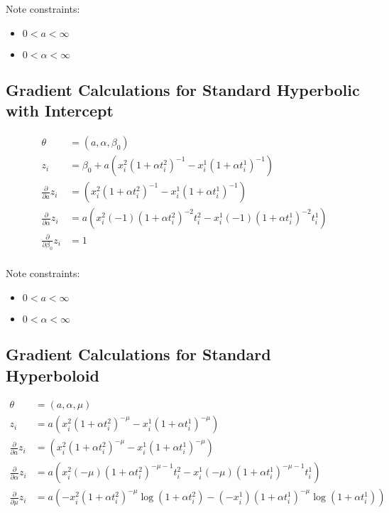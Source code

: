 \documentclass[12pt]{article}
\begin{document}
Note constraints:

\begin{itemize}
    \item{$0 < a < \infty$}
    \item{$0 < \alpha < \infty$}
\end{itemize}

\subsection{Gradient Calculations for Standard Hyperbolic with Intercept}

\begin{align*}
\theta &= (a, \alpha, \beta_0) \\
z_i &= \beta_0 + a (x^2_i (1 + \alpha t^2_i)^{-1} - x^1_i (1 + \alpha t^1_i)^{-1}) \\
\frac{\partial}{\partial a} z_i
  &= (x^2_i (1 + \alpha t^2_i)^{-1} - x^1_i (1 + \alpha t^1_i)^{-1}) \\
\frac{\partial}{\partial \alpha} z_i
  &= a (
    x^2_i (-1) (1 + \alpha t^2_i)^{-2} t^2_i
    - x^1_i (-1) (1 + \alpha t^1_i)^{-2} t^1_i
  ) \\
\frac{\partial}{\partial \beta_0} z_i &= 1 \\
\end{align*}

Note constraints:

\begin{itemize}
    \item{$0 < a < \infty$}
    \item{$0 < \alpha < \infty$}
\end{itemize}

\subsection{Gradient Calculations for Standard Hyperboloid}

\begin{align*}
\theta &= (a, \alpha, \mu) \\
z_i &= a (x^2_i (1 + \alpha t^2_i)^{-\mu} - x^1_i (1 + \alpha t^1_i)^{-\mu}) \\
\frac{\partial}{\partial a} z_i
  &= (x^2_i (1 + \alpha t^2_i)^{-\mu} - x^1_i (1 + \alpha t^1_i)^{-\mu}) \\
\frac{\partial}{\partial \alpha} z_i
  &= a (
    x^2_i (-\mu) (1 + \alpha t^2_i)^{-\mu - 1} t^2_i
    - x^1_i (-\mu) (1 + \alpha t^1_i)^{-\mu - 1} t^1_i
  ) \\
\frac{\partial}{\partial \mu} z_i
  &= a (
    -x^2_i (1 + \alpha t^2_i)^{-\mu} \log(1 + \alpha t^2_i)
    - (-x^1_i) (1 + \alpha t^1_i)^{-\mu} \log(1 + \alpha t^1_i)
  ) \\
\end{align*}
\end{document}
